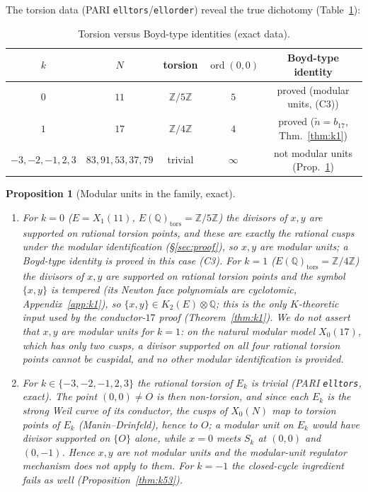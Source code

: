 \documentclass[preprint,12pt]{elsarticle}
\newtheorem{proposition}[theorem]{Proposition}
\theoremstyle{definition}
\theoremstyle{remark}
\newcommand{\Q}{\mathbb{Q}}
\newcommand{\Z}{\mathbb{Z}}
\begin{document}
The torsion data (PARI \texttt{elltors}/\texttt{ellorder}) reveal the true
dichotomy (Table~\ref{tab:torsion}):

\begin{table}[ht]
\centering\footnotesize
\begin{tabular}{@{}ccccc@{}}
\toprule
$k$ & $N$ & torsion & $\operatorname{ord}(0,0)$ & Boyd-type identity\\
\midrule
$0$ & $11$ & $\Z/5\Z$ & $5$ & proved (modular units, (C3))\\
$1$ & $17$ & $\Z/4\Z$ & $4$ & proved ($\tilde n=b_{17}$, Thm.~\ref{thm:k1})\\
$-3,-2,-1,2,3$ & $83,91,53,37,79$ & trivial & $\infty$ & not modular units
  (Prop.~\ref{thm:family})\\
\bottomrule
\end{tabular}
\caption{Torsion versus Boyd-type identities (exact data).}
\label{tab:torsion}
\end{table}

\begin{proposition}[Modular units in the family, exact]\label{thm:family}
\leavevmode
\begin{enumerate}
  \item For $k=0$ ($E=X_1(11)$, $E(\Q)_{\mathrm{tors}}=\Z/5\Z$) the divisors
  of $x,y$ are supported on rational torsion points, and these are exactly
  the rational cusps under the modular identification (\S\ref{sec:proof}),
  so $x,y$ are modular units; a Boyd-type identity is \emph{proved}
  in this case \emph{(C3)}.
  For $k=1$ ($E(\Q)_{\mathrm{tors}}=\Z/4\Z$) the divisors of $x,y$ are
  supported on rational torsion points and the symbol $\{x,y\}$ is tempered
  (its Newton face polynomials are cyclotomic, Appendix~\ref{app:k1}), so
  $\{x,y\}\in K_2(E)\otimes\Q$; this is the only $K$-theoretic input used
  by the conductor-$17$ proof (Theorem~\ref{thm:k1}).  We do \emph{not}
  assert that $x,y$ are modular units for $k=1$: on the natural modular
  model $X_0(17)$, which has only two cusps, a divisor supported on all
  four rational torsion points cannot be cuspidal, and no other modular
  identification is provided.
  \item For $k\in\{-3,-2,-1,2,3\}$ the rational torsion of $E_k$ is trivial
  (PARI \texttt{elltors}, exact). The point $(0,0)\neq O$ is then
  non-torsion, and since each $E_k$ is the strong Weil curve of its
  conductor, the cusps of $X_0(N)$ map to torsion points of $E_k$
  (Manin--Drinfeld), hence to $O$; a modular unit on $E_k$ would have
  divisor supported on $\{O\}$ alone, while $x=0$ meets $S_k$ at
  $(0,0)$ and $(0,-1)$. Hence $x,y$ are \emph{not} modular units and the
  modular-unit regulator mechanism does not apply to them. For $k=-1$ the
  closed-cycle ingredient fails as well
  (Proposition~\ref{thm:k53}).
\end{enumerate}
\end{proposition}
\end{document}

